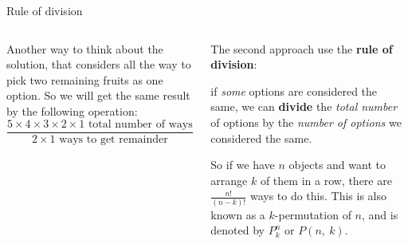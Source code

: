\documentclass[9pt,aspectratio=169]{beamer}
\begin{document}
\begin{frame}{Rule of division}
\begin{columns}[T]
\begin{column}{0.5\textwidth}
      Another way to think about the solution, that considers all the way to pick two remaining fruits as one option. So we will get the same result by the following operation:
      \[
        \frac{5 \times 4 \times 3 \times 2 \times 1 \text{\ total number of ways}}{2 \times 1 \text{\  ways to get remainder}} = \frac{5!}{2!} = 60.
      \]
    \end{column}
    \begin{column}{0.5\textwidth}
      The second approach use the \textbf{rule of division}:
      \begin{definition}
        if \emph{some} options are considered the same, we can \textbf{divide} the \emph{total number} of options by the \emph{number of options} we considered the same.
      \end{definition}

      So if we have $n$ objects and want to arrange $k$ of them in a row, there are $\frac{n!}{(n-k)!}$ ways to do this. This is also known as a $k$-permutation of $n$, and is denoted by $P_k^n$ or $P(n,\ k)$.\medskip


\end{column}
\end{columns}
\end{frame}
\end{document}

